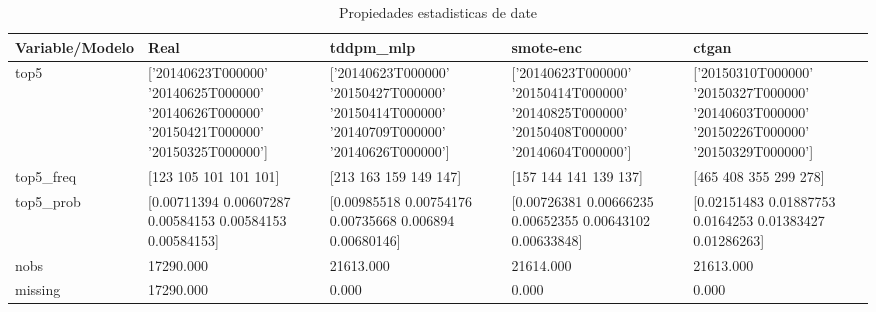 \begin{table}[H]
\centering
\caption{Propiedades  estadisticas de date}
\label{table-stats-date}
\begin{tabular}{|l|m{10em}|m{10em}|m{10em}|m{10em}|}
\hline
 \rowcolor[gray]{0.8}
Variable/Modelo & Real & tddpm\_mlp & smote-enc & ctgan \\
\hline top5 & ['20140623T000000' '20140625T000000' '20140626T000000' '20150421T000000'
 '20150325T000000'] & ['20140623T000000' '20150427T000000' '20150414T000000' '20140709T000000'
 '20140626T000000'] & ['20140623T000000' '20150414T000000' '20140825T000000' '20150408T000000'
 '20140604T000000'] & ['20150310T000000' '20150327T000000' '20140603T000000' '20150226T000000'
 '20150329T000000'] \\
\hline top5\_freq & [123 105 101 101 101] & [213 163 159 149 147] & [157 144 141 139 137] & [465 408 355 299 278] \\
\hline top5\_prob & [0.00711394 0.00607287 0.00584153 0.00584153 0.00584153] & [0.00985518 0.00754176 0.00735668 0.006894   0.00680146] & [0.00726381 0.00666235 0.00652355 0.00643102 0.00633848] & [0.02151483 0.01887753 0.0164253  0.01383427 0.01286263] \\
\hline nobs & 17290.000 & 21613.000 & 21614.000 & 21613.000 \\
\hline missing & 17290.000 & 0.000 & 0.000 & 0.000 \\
\hline
\end{tabular}
\end{table}
